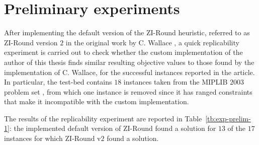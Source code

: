 \documentclass[a4paper,12pt]{book}
\begin{document}
\section{Preliminary experiments} \label{sec:preliminary-exp}
After implementing the default version of the ZI-Round heuristic, referred to as ZI-Round version $2$ in the original work by C. Wallace \cite{wallace2010}, a quick replicability experiment is carried out to check whether the custom implementation of the author of this thesis finds similar resulting objective values to those found by the implementation of C. Wallace, for the successful instances reported in the article. In particular, the test-bed contains $18$ instances taken from the MIPLIB $2003$ problem set \cite{miplib2003}, from which one instance is removed since it has ranged constraints that make it incompatible with the custom implementation. \par
The results of the replicability experiment are reported in Table~\ref{tb:exp-prelim-1}: the implemented default version of ZI-Round found a solution for $13$ of the $17$ instances for which ZI-Round v$2$ found a solution.
\end{document}
